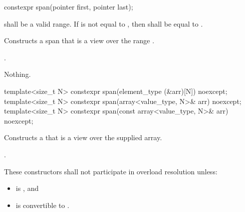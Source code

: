 %
\begin{itemdecl}
constexpr span(pointer first, pointer last);
\end{itemdecl}
\begin{itemdescr}
\pnum
\requires
{} shall be a valid range.
If  is not equal to ,
then  shall be equal to .

\pnum
\effects
Constructs a span that is a view over the range .

\pnum
\ensures
{}.

\pnum
\throws
Nothing.
\end{itemdescr}

%
\begin{itemdecl}
template<size_t N> constexpr span(element_type (&arr)[N]) noexcept;
template<size_t N> constexpr span(array<value_type, N>& arr) noexcept;
template<size_t N> constexpr span(const array<value_type, N>& arr) noexcept;
\end{itemdecl}
\begin{itemdescr}
\pnum
\effects
Constructs a  that is a view over the supplied array.

\pnum
\ensures
{}.

\pnum
\remarks
These constructors shall not participate in overload resolution unless:
\begin{itemize}
\item {} is , and
\item {} is convertible to .
\end{itemize}
\end{itemdescr}

